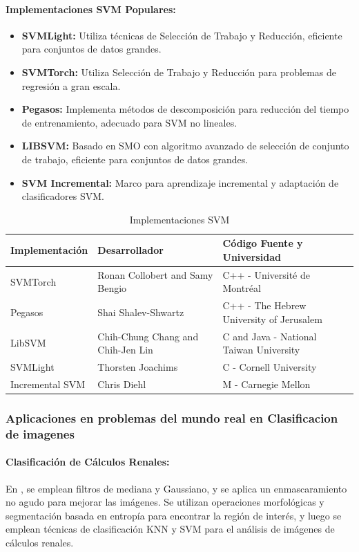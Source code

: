\paragraph*{Implementaciones SVM Populares:}
\begin{itemize}
	\item \textbf{SVMLight:} Utiliza técnicas de Selección de Trabajo y Reducción, eficiente para conjuntos de datos grandes.
	\item \textbf{SVMTorch:} Utiliza Selección de Trabajo y Reducción para problemas de regresión a gran escala.
	\item \textbf{Pegasos:} Implementa métodos de descomposición para reducción del tiempo de entrenamiento, adecuado para SVM no lineales.
	\item \textbf{LIBSVM:} Basado en SMO con algoritmo avanzado de selección de conjunto de trabajo, eficiente para conjuntos de datos grandes.
	\item \textbf{SVM Incremental:} Marco para aprendizaje incremental y adaptación de clasificadores SVM.
\end{itemize}

\begin{table}[H]
	\centering
	\caption{Implementaciones SVM}
	\label{tab:svm-implementations}
	\begin{tabular}{p{3cm}p{5cm}p{7cm}}
		\toprule
		\textbf{Implementación} & \textbf{Desarrollador} & \textbf{Código Fuente y Universidad} \\
		\midrule
		SVMTorch & Ronan Collobert and Samy Bengio & C++ - Université de Montréal \\
		Pegasos & Shai Shalev-Shwartz & C++ - The Hebrew University of Jerusalem\\
		LibSVM & Chih-Chung Chang and Chih-Jen Lin & C and Java - National Taiwan University \\
		SVMLight & Thorsten Joachims & C - Cornell University \\
		Incremental SVM & Chris Diehl & M - Carnegie Mellon \\
		\bottomrule
	\end{tabular}
\end{table}

\subsubsection{Aplicaciones en problemas del mundo real en Clasificacion de imagenes}
\paragraph{Clasificación de Cálculos Renales:} En \cite{svmm1}, se emplean filtros de mediana y Gaussiano, y se aplica un enmascaramiento no agudo para mejorar las imágenes. Se utilizan operaciones morfológicas y segmentación basada en entropía para encontrar la región de interés, y luego se emplean técnicas de clasificación KNN y SVM para el análisis de imágenes de cálculos renales.

